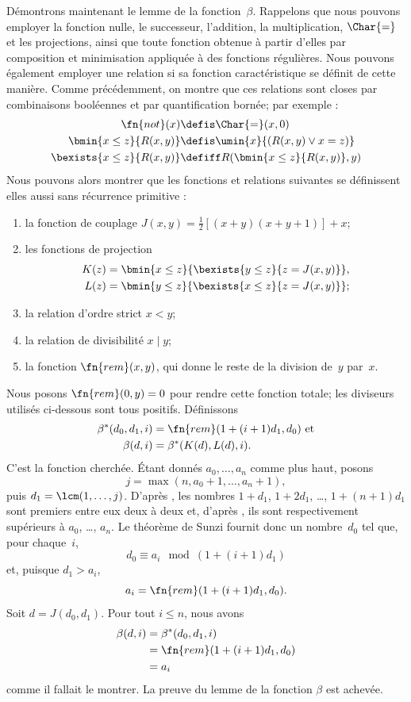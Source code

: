 \documentclass[../../../include/open-logic-section]{subfiles}
\begin{document}
Démontrons maintenant le lemme de la fonction~$\beta$. Rappelons
que nous pouvons employer la fonction nulle, le successeur,
l'addition, la multiplication, $\Char{=}$ et les projections,
ainsi que toute fonction obtenue à partir d'elles par composition
et minimisation appliquée à des fonctions régulières. Nous
pouvons également employer une relation si sa fonction
caractéristique se définit de cette manière. Comme précédemment,
on montre que ces relations sont closes par combinaisons
booléennes et par quantification bornée; par exemple :
\begin{align*}
\fn{not}(x) & \defis \Char{=}(x,0)\\
\bmin{x \leq z}{R(x,y)} & \defis \umin{x}{(R(x,y) \lor x = z)}\\
\bexists{x \leq z}{R(x,y)} & \defiff R(\bmin{x \leq z}{R(x,y)}, y)
\end{align*}
Nous pouvons alors montrer que les fonctions et relations
suivantes se définissent elles aussi sans récurrence primitive :
\begin{enumerate}
\item la fonction de couplage
  $J(x,y)=\frac{1}{2}[(x+y)(x+y+1)]+x$;
\item les fonctions de projection
\begin{align*}
K(z) & = \bmin{x \leq z}{\bexists{y \leq z}{z = J(x,y)}},\\
L(z) & = \bmin{y \leq z}{\bexists{x \leq z}{z = J(x,y)}};
\end{align*}
\item la relation d'ordre strict $x<y$;
\item la relation de divisibilité $x\mid y$;
\item la fonction $\fn{rem}(x,y)$, qui donne le reste de la division
  de~$y$ par~$x$.
\end{enumerate}
Nous posons $\fn{rem}(0,y)=0$ pour rendre cette fonction totale;
les diviseurs utilisés ci-dessous sont tous positifs.
Définissons
\begin{align*}
\beta^*(d_0,d_1,i) & = \fn{rem}(1+(i+1) d_1,d_0) \text{ et}\\
\beta(d,i) & = \beta^*(K(d),L(d),i).
\end{align*}
C'est la fonction cherchée. Étant donnés
$a_0,\dots,a_n$ comme plus haut, posons
\[
j = \max(n,a_0+1,\dots,a_n+1),
\]
puis $d_1=\lcm(1,\dots,j)$. D'après , les
nombres $1+d_1$, $1+2d_1$, \dots, $1+(n+1)d_1$ sont premiers
entre eux deux à deux et, d'après , ils sont
respectivement supérieurs à $a_0$, \dots, $a_n$. Le théorème de
Sunzi fournit donc un nombre~$d_0$ tel que, pour chaque~$i$,
\[
d_0 \equiv a_i \mod (1+(i+1)d_1)
\]
et, puisque $d_1>a_i$,
\[
a_i = \fn{rem}(1+(i+1)d_1,d_0).
\]
Soit $d=J(d_0,d_1)$. Pour tout $i\le n$, nous avons
\begin{align*}
\beta(d,i) & =  \beta^*(d_0,d_1,i) \\
& =  \fn{rem}(1+(i+1) d_1,d_0) \\
& =  a_i
\end{align*}
comme il fallait le montrer. La preuve du lemme de la fonction
$\beta$ est achevée.
\end{document}
